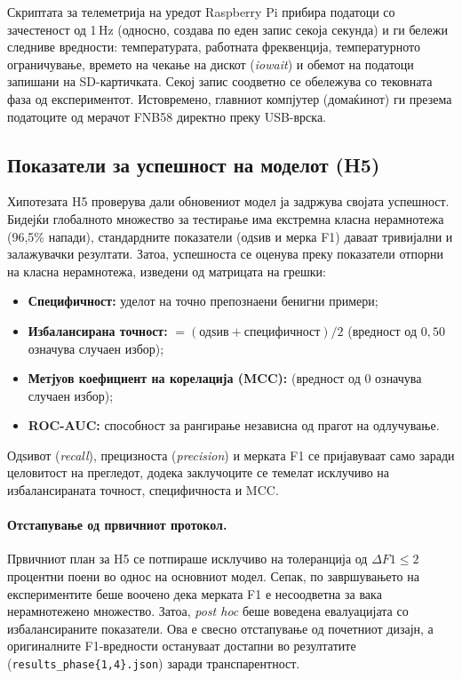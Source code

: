 Скриптата за телеметрија на уредот Raspberry Pi прибира податоци со зачестеност од 1\,Hz (односно, создава по еден запис секоја секунда) и ги бележи следниве вредности: температурата, работната фреквенција, температурното ограничување, времето на чекање на дискот (\emph{iowait}) и обемот на податоци запишани на SD-картичката. Секој запис соодветно се обележува со тековната фаза од експериментот. Истовремено, главниот компјутер (домаќинот) ги презема податоците од мерачот FNB58 директно преку USB-врска.

\subsection{Показатели за успешност на моделот (H5)}
\label{subsec:utility-metrics}

Хипотезата H5 проверува дали обновениот модел ја задржува својата успешност. Бидејќи глобалното множество за тестирање има екстремна класна нерамнотежа (96,5\% напади), стандардните показатели (одѕив и мерка F1) даваат тривијални и залажувачки резултати. Затоа, успешноста се оценува преку показатели отпорни на класна нерамнотежа, изведени од матрицата на грешки:

\begin{itemize}
  \item \textbf{Специфичност:} уделот на точно препознаени бенигни примери;
  \item \textbf{Избалансирана точност:} $=(\text{одѕив} + \text{специфичност}) / 2$ (вредност од $0{,}50$ означува случаен избор);
  \item \textbf{Метјуов коефициент на корелација (MCC):} (вредност од $0$ означува случаен избор);
  \item \textbf{ROC-AUC:} способност за рангирање независна од прагот на одлучување.
\end{itemize}


Одѕивот (\emph{recall}), прецизноста (\emph{precision}) и мерката F1 се пријавуваат само заради целовитост на прегледот, додека заклучоците се темелат исклучиво на избалансираната точност, специфичноста и MCC.

\paragraph{Отстапување од првичниот протокол.} Првичниот план за H5 се потпираше исклучиво на толеранција од $\Delta F1 \leq 2$ процентни поени во однос на основниот модел. Сепак, по завршувањето на експериментите беше воочено дека мерката F1 е несоодветна за вака нерамнотежено множество. Затоа, \emph{post hoc} беше воведена евалуацијата со избалансираните показатели. Ова е свесно отстапување од почетниот дизајн, а оригиналните F1-вредности остануваат достапни во резултатите (\texttt{results\_phase\{1,4\}.json}) заради транспарентност.

